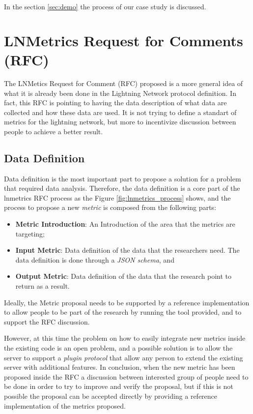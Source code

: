 In the section \ref{sec:demo} the process of our case study is discussed.

\section{LNMetrics Request for Comments (RFC)}

The LNMetics Request for Comment (RFC) proposed is a more general idea of what 
it is already been done in the Lightning Network protocol definition. In fact,
this RFC is pointing to having the data description of what data are collected 
and how these data are used. It is not trying to define a 
standart of metrics for the lightning network, 
but more to incentivize discussion between people to achieve a better result.

\subsection{Data Definition}

Data definition is the most important part to propose a solution for a problem 
that required data analysis. Therefore, the data definition is a core 
part of the lnmetrics RFC process as the Figure \ref{fig:lnmetrics_process}
shows, and the process to propose a new \emph{metric} is composed from 
the following parts:

\begin{itemize}
    \item {\bf Metric Introduction}: An Introduction of the area that the metrics are targeting;
    \item {\bf Input Metric}: Data definition of the data that the researchers need. The data definition is done through a \emph{JSON schema}, and
    \item {\bf Output Metric}: Data definition of the data that the research point to return as a result. 
\end{itemize}

Ideally, the Metric proposal needs to be supported by a reference implementation to 
allow people to be part of the research by running the tool provided, and 
to support the RFC discussion.

However, at this time the problem on how to easily integrate new metrics inside the 
existing code is an open problem, and a possible solution is to allow the server 
to support a \emph{plugin protocol} that allow any person to extend the existing 
server with additional features.
In conclusion, when the new metric has been proposed inside the RFC a discussion between interested 
group of people need to be done in order to try to improve and verify the proposal, but if this is not possible
the proposal can be accepted directly by providing a reference implementation of the metrics proposed.

